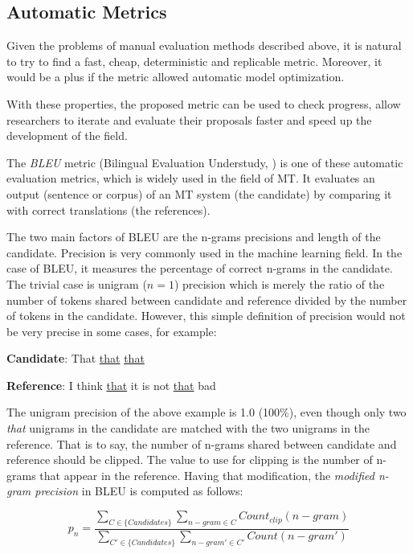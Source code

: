 \subsection{Automatic Metrics}
\label{the-eval-auto}

Given the problems of manual evaluation methods described above, it is natural to try to find a fast, cheap, deterministic and replicable metric. Moreover, it would be a plus if the metric allowed automatic model optimization.  

With these properties, the proposed metric can be used to check progress, allow researchers to iterate and evaluate their proposals faster and speed up the development of the field.

The \textit{BLEU} metric (Bilingual Evaluation Understudy, \cite{BLEU}) is one of these automatic evaluation metrics, which is widely used in the field of MT.
It evaluates an output (sentence or corpus) of an MT system (the candidate) by comparing it with correct translations (the references).

The two main factors of BLEU are the n-grams precisions and length of the candidate.
Precision is very commonly used in the machine learning field.
In the case of BLEU, it measures the percentage of correct n-grams in the candidate.
The trivial case is unigram ($n=1$) precision which is merely the ratio of the number of tokens shared between candidate and reference divided by the number of tokens in the candidate.
However, this simple definition of precision would not be very precise in some cases, for example:

\bigskip

\textbf{Candidate}: That \underline{that} \underline{that}

\textbf{Reference}: I think \underline{that} it is not \underline{that} bad

\bigskip

The unigram precision of the above example is 1.0 (100\%), even though only two \textit{that} unigrams in the candidate are matched with the two unigrams in the reference.
That is to say, the number of n-grams shared between candidate and reference should be clipped.
The value to use for clipping is the number of n-grams that appear in the reference. 
Having that modification, the \textit{modified n-gram precision} in BLEU is computed as follows:

\[ p_n=\frac{\sum_{C\in\{Candidates\}}\sum_{n-gram\in C}Count_{clip}(n-gram)}{\sum_{C'\in\{Candidates\}}\sum_{n-gram'\in C'}Count(n-gram')} \]

